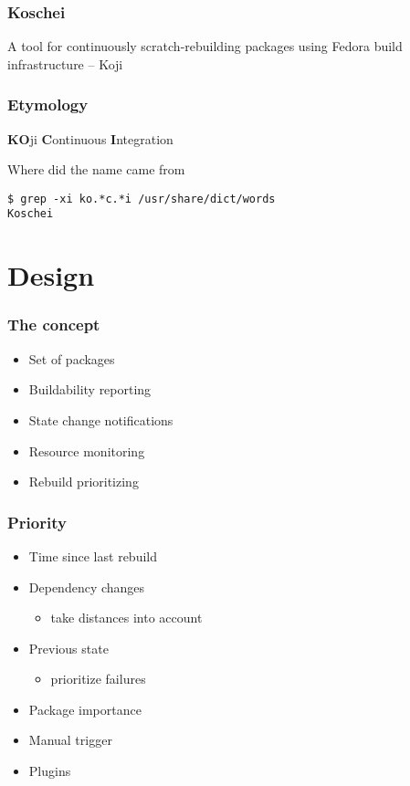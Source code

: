 \documentclass[pdftex,unicode,xcolor=table]{beamer}
\begin{document}
\Large
\begin{frame}
  \frametitle{Koschei}
  A tool for continuously scratch-rebuilding
  packages using Fedora build infrastructure -- Koji
\end{frame}

\large
\begin{frame}[fragile]
  \frametitle{Etymology}
\textbf{KO}ji \textbf{C}ontinuous \textbf{I}ntegration
\vspace{30 pt}
\begin{block}{Where did the name came from}
\begin{verbatim}
$ grep -xi ko.*c.*i /usr/share/dict/words
Koschei
\end{verbatim}
\end{block}
\end{frame}

\section{Design}
\begin{frame}
  \frametitle{The concept}
  \begin{itemize}
  \item Set of packages
  \item Buildability reporting
  \item State change notifications
  \item Resource monitoring
  \item Rebuild prioritizing
  \end{itemize}
\end{frame}

\begin{frame}
  \frametitle{Priority}
  \begin{itemize}
    \item Time since last rebuild
    \item Dependency changes
    \begin{itemize}
      \item take distances into account
    \end{itemize}
    \item Previous state
    \begin{itemize}
      \item prioritize failures
    \end{itemize}
    \item Package importance
    \item Manual trigger
    \item Plugins
  \end{itemize}
\end{frame}
\end{document}
